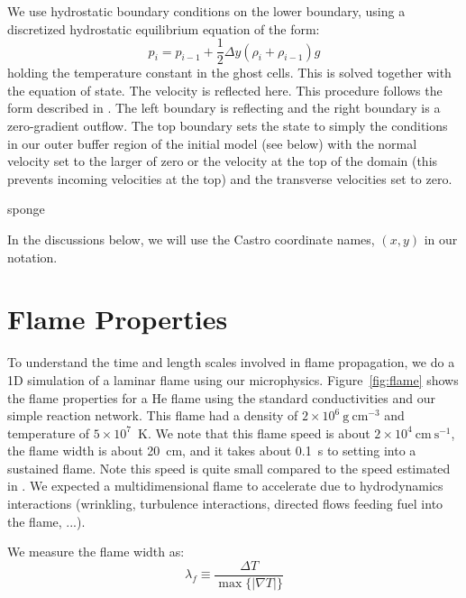 \documentclass[twocolumn,times,tighten]{aastex62}
\newcommand{\gcc}{\mathrm{g~cm^{-3} }}
\newcommand{\cms}{\mathrm{cm~s^{-1} }}
\newcommand{\MarginPar}[1]{\marginpar{\vskip-\baselineskip\raggedright\tiny\sffamily\hrule\smallskip{\color{red}#1}\par\smallskip\hrule}}
\begin{document}
We use hydrostatic boundary conditions on the lower boundary, using
a discretized hydrostatic equilibrium equation of the form:
\begin{equation}
\label{eq:hse}
p_i = p_{i-1} + \frac{1}{2} \Delta y (\rho_i + \rho_{i-1}) g
\end{equation}
holding the temperature constant in the ghost cells.  This is solved
together with the equation of state.  The velocity is reflected here.
This procedure follows the form described in \citet{ppm-hse}.  The
left boundary is reflecting and the right boundary is a zero-gradient
outflow.  The top boundary sets the state to simply the conditions
in our outer buffer region of the initial model (see below) with the
normal velocity set to the larger of zero or the velocity at the top
of the domain (this prevents incoming velocities at the top) and the
transverse velocities set to zero.

sponge\MarginPar{write}

In the discussions below, we will use the Castro coordinate 
names, $(x, y)$ in our notation.



\section{Flame Properties}\label{Sec:Flame}



To understand the time and length scales involved in flame
propagation, we do a 1D simulation of a laminar flame using our
microphysics.  Figure~\ref{fig:flame} shows the flame properties for a
He flame using the standard conductivities and our simple reaction
network.  This flame had a density of $2\times 10^6~\gcc$ and
temperature of $5\times 10^7$~K.  We note that this flame speed is
about $2\times 10^4~\cms$, the flame width is about 20~cm, and it
takes about 0.1~s to setting into a sustained flame.  Note this speed
is quite small compared to the speed estimated in
\citet{spitkovsky2002}.  We expected a multidimensional flame to
accelerate due to hydrodynamics interactions (wrinkling, turbulence
interactions, directed flows feeding fuel into the flame, ...).

We measure the flame width as:
\begin{equation}
\lambda_f \equiv \frac{\Delta T}{\max\{|\nabla T|\}}
\end{equation}
\end{document}
